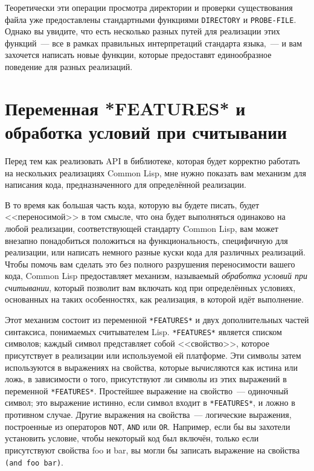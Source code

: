 Теоретически эти операции просмотра директории и проверки существования файла уже
предоставлены стандартными функциями \lstinline{DIRECTORY} и \lstinline{PROBE-FILE}. Однако вы
увидите, что есть несколько разных путей для реализации этих функций~--- все в рамках
правильных интерпретаций стандарта языка,~--- и вам захочется написать новые функции,
которые предоставят единообразное поведение для разных реализаций.

\section{Переменная *FEATURES* и обработка условий при считывании}

Перед тем как реализовать API в библиотеке, которая будет корректно работать на
нескольких реализациях Common Lisp, мне нужно показать вам механизм для написания кода,
предназначенного для определённой реализации.

В то время как большая часть кода, которую вы будете писать, будет <<переносимой>> в том
смысле, что она будет выполняться одинаково на любой реализации, соответствующей стандарту
Common Lisp, вам может внезапно понадобиться положиться на функциональность, специфичную
для реализации, или написать немного разные куски кода для различных реализаций. Чтобы
помочь вам сделать это без полного разрушения переносимости вашего кода, Common Lisp
предоставляет механизм, называемый \textit{обработка условий при считывании}, который
позволит вам включать код при определённых условиях, основанных на таких особенностях, как
реализация, в которой идёт выполнение.

Этот механизм состоит из переменной \lstinline{*FEATURES*} и двух дополнительных частей
синтаксиса, понимаемых считывателем Lisp. \lstinline{*FEATURES*} является списком символов;
каждый символ представляет собой <<свойство>>, которое присутствует в реализации или
используемой ей платформе. Эти символы затем используются в выражениях на свойства,
которые вычисляются как истина или ложь, в зависимости о того, присутствуют ли символы из
этих выражений в переменной \lstinline{*FEATURES*}. Простейшее выражение на свойство~---
одиночный символ; это выражение истинно, если символ входит в \lstinline{*FEATURES*}, и ложно в
противном случае. Другие выражения на свойства~--- логические выражения, построенные из
операторов \lstinline{NOT}, \lstinline{AND} или \lstinline{OR}. Например, если бы вы захотели установить
условие, чтобы некоторый код был включён, только если присутствуют свойства foo и bar, вы
могли бы записать выражение на свойства \lstinline{(and foo bar)}.

